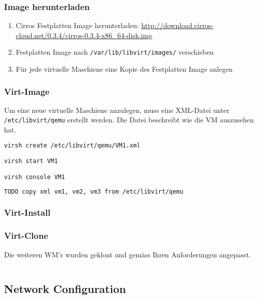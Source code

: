 \subsubsection{Image herunterladen}
\begin{enumerate}
	\item Cirros Festplatten Image herunterladen: \url{http://download.cirros-cloud.net/0.3.4/cirros-0.3.4-x86_64-disk.img}
	\item Festplatten Image nach \lstinline|/var/lib/libvirt/images/| verschieben
	\item Für jede virtuelle Maschiene eine Kopie des Festplatten Image anlegen
\end{enumerate}

\subsubsection{Virt-Image}
Um eine neue virtuelle Maschiene anzulegen, muss eine XML-Datei unter \lstinline|/etc/libvirt/qemu| erstellt werden. Die Datei beschreibt wie die VM auszusehen hat. 


\begin{lstlisting}[language=bash]
virsh create /etc/libvirt/qemu/VM1.xml

virsh start VM1 

virsh console VM1
\end{lstlisting}

\begin{lstlisting}[language=XML]
 TODO copy xml vm1, vm2, vm3 from /etc/libvirt/qemu
\end{lstlisting}

\subsubsection{Virt-Install}

\subsubsection{Virt-Clone}
Die weiteren WM's wurden geklont und gemäss Ihren Anforderungen angepasst.
\begin{lstlisting}[language=bash]

\end{lstlisting}


\subsection{Network Configuration}


